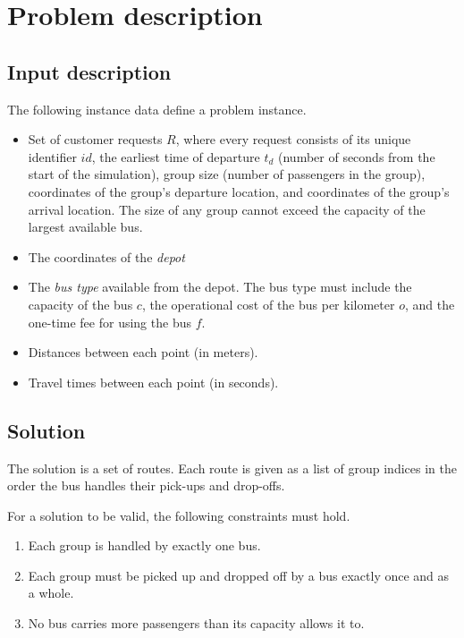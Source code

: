 \chapter{Problem description}\label{ch:problem}
\section{Input description}

The following instance data define a problem instance.

\begin{itemize}
    \item Set of customer requests $R$, where every request consists of its unique identifier $id$, the earliest time of departure $t_d$ (number of seconds from the start of the simulation), group size (number of passengers in the group), coordinates of the group's departure location, and coordinates of the group's arrival location. The size of any group cannot exceed the capacity of the largest available bus.
    \item The coordinates of the \textit{depot}
    \item The \textit{bus type} available from the depot. The bus type must include the capacity of the bus $c$, the operational cost of the bus per kilometer $o$, and the one-time fee for using the bus $f$.
    \item Distances between each point (in meters).
    \item Travel times between each point (in seconds).
\end{itemize}

\section{Solution} \label{sec:solution}

The solution is a set of routes. Each route is given as a list of group indices in the order the bus handles their pick-ups and drop-offs.

For a solution to be valid, the following constraints must hold.

\begin{enumerate}[(1)]\label{constraints}
    \setlength\itemsep{0pt}
    \item Each group is handled by exactly one bus.
    \item Each group must be picked up and dropped off by a bus exactly once and as a whole.
    \item No bus carries more passengers than its capacity allows it to.
\end{enumerate}

